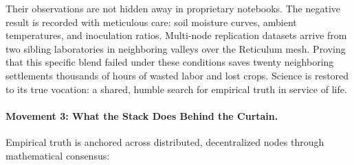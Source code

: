 Their observations are not hidden away in proprietary notebooks. The negative result is recorded with meticulous care: soil moisture curves, ambient temperatures, and inoculation ratios. Multi-node replication datasets arrive from two sibling laboratories in neighboring valleys over the Reticulum mesh. Proving that this specific blend failed under these conditions saves twenty neighboring settlements thousands of hours of wasted labor and lost crops. Science is restored to its true vocation: a shared, humble search for empirical truth in service of life.

\paragraph{Movement 3: What the Stack Does Behind the Curtain.}
Empirical truth is anchored across distributed, decentralized nodes through mathematical consensus:
